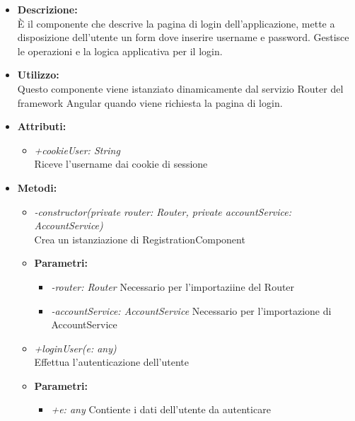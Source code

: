 \begin{itemize}
	\item \textbf{Descrizione:}\\
	È il componente che descrive la pagina di login dell’applicazione, mette a disposizione dell’utente un form dove inserire username e password. Gestisce le operazioni e la logica applicativa per il login.
	\item \textbf{Utilizzo:}\\
	Questo componente viene istanziato dinamicamente dal servizio Router del framework Angular quando viene richiesta la pagina di login.
	\item \textbf{Attributi:}\\
		\begin{itemize}
			\item \emph{+cookieUser: String}\\
			Riceve l'username dai cookie di sessione
		\end{itemize}
	\item \textbf{Metodi:}
		\begin{itemize}
			\item \emph{-constructor(private router: Router, private accountService: AccountService)}\\
    	Crea un istanziazione di RegistrationComponent
    	\item \textbf{Parametri:}
    		\begin{itemize}
    			\item \emph{-router: Router}
    			Necessario per l'importaziine del Router
    			\item \emph{-accountService: AccountService}
    			Necessario per l'importazione di AccountService
    		\end{itemize}
    		\item \emph{+loginUser(e: any)}\\
    		Effettua l'autenticazione dell'utente
    	\item \textbf{Parametri:}
    		\begin{itemize}
    			\item \emph{+e: any}
    			Contiente i dati dell'utente da autenticare
    		\end{itemize}
		\end{itemize}
\end{itemize}